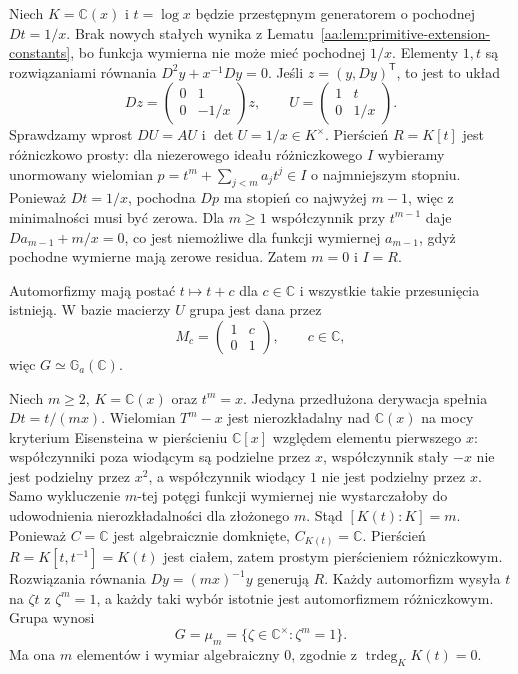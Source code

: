 \begin{przyklad}
\label{aa:prz:pv-additive}
Niech $K=\mathbb C(x)$ i
$t=\log x$ będzie przestępnym
generatorem o pochodnej $Dt=1/x$.
Brak nowych stałych wynika z
Lematu~\ref{aa:lem:primitive-extension-constants},
bo funkcja wymierna nie może
mieć pochodnej $1/x$.
Elementy $1,t$ są rozwiązaniami
równania $D^2y+x^{-1}Dy=0$.
Jeśli $z=(y,Dy)^{\mathsf T}$,
to jest to układ
\[
 Dz=\begin{pmatrix}0&1\\0&-1/x\end{pmatrix}z,
 \qquad
 U=\begin{pmatrix}1&t\\0&1/x\end{pmatrix}.
\]
Sprawdzamy wprost $DU=AU$ i
$\det U=1/x\in K^\times$.
Pierścień $R=K[t]$ jest
różniczkowo prosty:
dla niezerowego ideału
różniczkowego $I$ wybieramy
unormowany wielomian
$p=t^m+\sum_{j<m}a_jt^j\in I$
o najmniejszym stopniu.
Ponieważ $Dt=1/x$,
pochodna $Dp$ ma stopień
co najwyżej $m-1$, więc
z minimalności musi być zerowa.
Dla $m\ge1$ współczynnik
przy $t^{m-1}$ daje
$Da_{m-1}+m/x=0$,
co jest niemożliwe dla
funkcji wymiernej $a_{m-1}$,
gdyż pochodne wymierne
mają zerowe residua.
Zatem $m=0$ i $I=R$.

Automorfizmy mają postać
$t\mapsto t+c$ dla
$c\in\mathbb C$ i wszystkie
takie przesunięcia istnieją.
W bazie macierzy $U$ grupa
jest dana przez
\[
 M_c=\begin{pmatrix}1&c\\0&1\end{pmatrix},
 \qquad c\in\mathbb C,
\]
więc $G\simeq\mathbb G_a(\mathbb C)$.
\end{przyklad}

\begin{przyklad}
\label{aa:prz:pv-cyclic}
Niech $m\ge2$, $K=\mathbb C(x)$
oraz $t^m=x$. Jedyna
przedłużona derywacja
spełnia $Dt=t/(mx)$.
Wielomian $T^m-x$ jest
nierozkładalny nad $\mathbb C(x)$
na mocy kryterium Eisensteina
w pierścieniu $\mathbb C[x]$
względem elementu pierwszego $x$:
współczynniki poza wiodącym
są podzielne przez $x$,
współczynnik stały $-x$
nie jest podzielny przez $x^2$,
a współczynnik wiodący $1$
nie jest podzielny przez $x$.
Samo wykluczenie $m$-tej potęgi
funkcji wymiernej nie wystarczałoby
do udowodnienia nierozkładalności
dla złożonego $m$.
Stąd $[K(t):K]=m$.
Ponieważ $C=\mathbb C$
jest algebraicznie domknięte,
$C_{K(t)}=\mathbb C$.
Pierścień $R=K[t,t^{-1}]=K(t)$
jest ciałem, zatem prostym
pierścieniem różniczkowym.
Rozwiązania równania
$Dy=(mx)^{-1}y$ generują $R$.
Każdy automorfizm wysyła
$t$ na $\zeta t$ z
$\zeta^m=1$, a każdy taki
wybór istotnie jest
automorfizmem różniczkowym.
Grupa wynosi
\[
 G=\mu_m=\{\zeta\in\mathbb C^\times:
                       \zeta^m=1\}.
\]
Ma ona $m$ elementów i wymiar
algebraiczny $0$, zgodnie z
$\operatorname{trdeg}_K K(t)=0$.
\end{przyklad}

